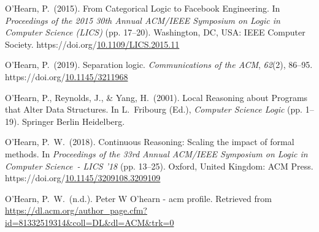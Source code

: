 \documentclass[12pt,twoside]{article}
\begin{document}
{\begin{thebibliography}{222}
\mdbibitemlabel{}O’Hearn, P.~(2015). From Categorical Logic to Facebook Engineering. In \emph{Proceedings of the 2015 30th Annual ACM/IEEE Symposium on Logic in Computer Science (LICS)} (pp. 17–20). Washington, DC, USA: IEEE Computer Society. https://doi.org/\href{https://dx.doi.org/10.1109/LICS.2015.11}{10.1109/LICS.2015.11}\label{ohearn_categorical_2015}%

\mdbibitemlabel{}O’Hearn, P.~(2019). Separation logic. \emph{Communications of the ACM}, \emph{62}(2), 86–95. https://doi.org/\href{https://dx.doi.org/10.1145/3211968}{10.1145/3211968}\label{ohearn_separation_2019}%

\mdbibitemlabel{}O’Hearn, P., Reynolds, J., \& Yang, H.~(2001). Local Reasoning about Programs that Alter Data Structures. In L.~Fribourg (Ed.), \emph{Computer Science Logic} (pp. 1–19). Springer Berlin Heidelberg.\label{ohearn_local_2001}%

\mdbibitemlabel{}O’Hearn, P.~W.~(2018). Continuous Reasoning: Scaling the impact of formal methods. In \emph{Proceedings of the 33rd Annual ACM/IEEE Symposium on Logic in Computer Science~- LICS ’18} (pp. 13–25). Oxford, United Kingdom: ACM Press. https://doi.org/\href{https://dx.doi.org/10.1145/3209108.3209109}{10.1145/3209108.3209109}\label{ohearn_continuous_2018}%

\mdbibitemlabel{}O’Hearn, P.~W.~(n.d.). Peter W O’hearn - acm profile. Retrieved from \href{https://dl.acm.org/author_page.cfm?id=81332519314\%26coll=DL\%26dl=ACM\%26trk=0}{{\ttfamily https://\hspace{0pt}dl.\hspace{0pt}acm.\hspace{0pt}org/\hspace{0pt}author\_\hspace{0pt}page.\hspace{0pt}cfm?\hspace{0pt}id=\hspace{0pt}81332519314\&\hspace{0pt}coll=\hspace{0pt}DL\&\hspace{0pt}dl=\hspace{0pt}ACM\&\hspace{0pt}trk=\hspace{0pt}0}}\label{ohearn_peter_nodate}%


\end{thebibliography}}
\end{document}
